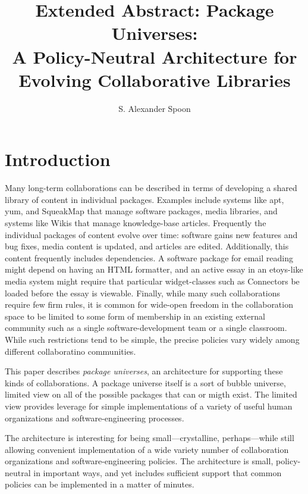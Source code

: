 \documentclass{IEEEtran}
\begin{document}
\title{Extended Abstract:
       Package Universes:\\
       A Policy-Neutral Architecture for Evolving Collaborative Libraries}
\author{S. Alexander Spoon}
\maketitle


\section{Introduction}

Many long-term collaborations can be described in terms of developing
a shared library of content in individual packages.  
Examples include
systems like apt, yum, and SqueakMap that manage software
packages, 
media libraries,
and systems like Wikis that manage knowledge-base articles.
Frequently the individual packages of content evolve over time:
software gains new features and bug fixes, media content is updated,
and articles are edited.  Additionally, this content frequently
includes dependencies.  A software package for email reading might
depend on having an HTML formatter, and an active essay in an
etoys-like
media system might require that particular widget-classes such as Connectors
be loaded before the essay is viewable.  Finally, while many such
collaborations require few firm rules, it is common for wide-open
freedom in the collaboration space to be limited to some form of
membership in an existing external community such as a single
software-development team or a single classroom.  While such
restrictions tend to be simple, the precise policies vary widely among
different collaboratino communities.


This paper describes \emph{package universes}, an architecture for
supporting these kinds of collaborations.  A package universe itself
is a sort of bubble universe, limited view on all of the possible
packages that can or migth exist.  The limited view provides leverage
for simple implementations of a variety of useful human organizations
and software-engineering processes.

The architecture is interesting for being small---crystalline,
perhaps---while still allowing convenient implementation of a wide
variety number of collaboration organizations and software-engineering
policies.  The architecture is small, policy-neutral in important
ways, and yet includes sufficient support that common policies can be
implemented in a matter of minutes.
\end{document}
